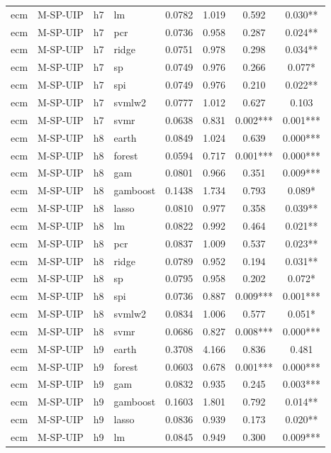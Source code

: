 \begin{ThreePartTable}
\begin{longtable}[t]{llclcccc}
ecm & M-SP-UIP & h7 & lm & 0.0782 & 1.019 & 0.592 & 0.030**\\
ecm & M-SP-UIP & h7 & pcr & 0.0736 & 0.958 & 0.287 & 0.024**\\
ecm & M-SP-UIP & h7 & ridge & 0.0751 & 0.978 & 0.298 & 0.034**\\
ecm & M-SP-UIP & h7 & sp & 0.0749 & 0.976 & 0.266 & 0.077*\\
ecm & M-SP-UIP & h7 & spi & 0.0749 & 0.976 & 0.210 & 0.022**\\
ecm & M-SP-UIP & h7 & svmlw2 & 0.0777 & 1.012 & 0.627 & 0.103\\
ecm & M-SP-UIP & h7 & svmr & 0.0638 & 0.831 & 0.002*** & 0.001***\\
\addlinespace
ecm & M-SP-UIP & h8 & earth & 0.0849 & 1.024 & 0.639 & 0.000***\\
ecm & M-SP-UIP & h8 & forest & 0.0594 & 0.717 & 0.001*** & 0.000***\\
ecm & M-SP-UIP & h8 & gam & 0.0801 & 0.966 & 0.351 & 0.009***\\
ecm & M-SP-UIP & h8 & gamboost & 0.1438 & 1.734 & 0.793 & 0.089*\\
ecm & M-SP-UIP & h8 & lasso & 0.0810 & 0.977 & 0.358 & 0.039**\\
ecm & M-SP-UIP & h8 & lm & 0.0822 & 0.992 & 0.464 & 0.021**\\
ecm & M-SP-UIP & h8 & pcr & 0.0837 & 1.009 & 0.537 & 0.023**\\
ecm & M-SP-UIP & h8 & ridge & 0.0789 & 0.952 & 0.194 & 0.031**\\
ecm & M-SP-UIP & h8 & sp & 0.0795 & 0.958 & 0.202 & 0.072*\\
ecm & M-SP-UIP & h8 & spi & 0.0736 & 0.887 & 0.009*** & 0.001***\\
ecm & M-SP-UIP & h8 & svmlw2 & 0.0834 & 1.006 & 0.577 & 0.051*\\
ecm & M-SP-UIP & h8 & svmr & 0.0686 & 0.827 & 0.008*** & 0.000***\\
\addlinespace
ecm & M-SP-UIP & h9 & earth & 0.3708 & 4.166 & 0.836 & 0.481\\
ecm & M-SP-UIP & h9 & forest & 0.0603 & 0.678 & 0.001*** & 0.000***\\
ecm & M-SP-UIP & h9 & gam & 0.0832 & 0.935 & 0.245 & 0.003***\\
ecm & M-SP-UIP & h9 & gamboost & 0.1603 & 1.801 & 0.792 & 0.014**\\
ecm & M-SP-UIP & h9 & lasso & 0.0836 & 0.939 & 0.173 & 0.020**\\
ecm & M-SP-UIP & h9 & lm & 0.0845 & 0.949 & 0.300 & 0.009***\\

\end{longtable}
\end{ThreePartTable}
